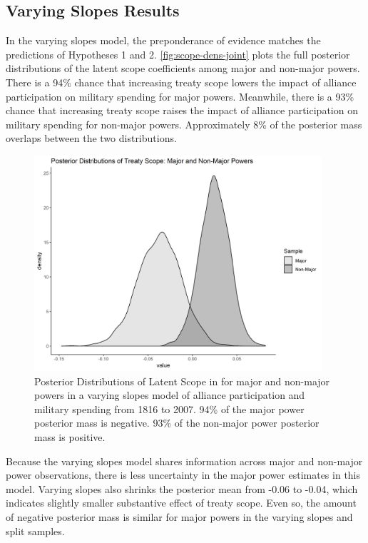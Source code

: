 \documentclass[12pt]{article}
\begin{document}
\subsection{Varying Slopes Results}


In the varying slopes model, the preponderance of evidence matches the predictions of Hypotheses 1 and 2. 
\autoref{fig:scope-dens-joint} plots the full posterior distributions of the latent scope coefficients among major and non-major powers. 
There is a 94\% chance that increasing treaty scope lowers the impact of alliance participation on military spending for major powers. 
Meanwhile, there is a 93\% chance that increasing treaty scope raises the impact of alliance participation on military spending for non-major powers. 
Approximately 8\% of the posterior mass overlaps between the two distributions. 


\begin{figure}[htbp]
	\centering
		\includegraphics[width=0.95\textwidth]{scope-dens-joint.png}
	\caption{Posterior Distributions of Latent Scope in for major and non-major powers in a varying slopes model of alliance participation and military spending from 1816 to 2007. 94\% of the major power posterior mass is negative. 93\% of the non-major power posterior mass is positive.}
	\label{fig:scope-dens-joint}
\end{figure}


Because the varying slopes model shares information across major and non-major power observations, there is less uncertainty in the major power estimates in this model. 
Varying slopes also shrinks the posterior mean from -0.06 to -0.04, which indicates slightly smaller substantive effect of treaty scope. 
Even so, the amount of negative posterior mass is similar for major powers in the varying slopes and split samples. 
\end{document}
